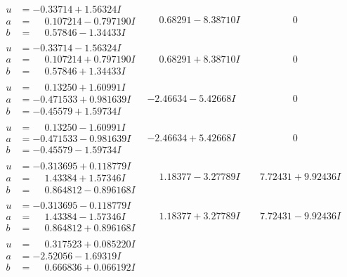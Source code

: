 \documentclass[1p]{elsarticle_modified}
\theoremstyle{definition}
\begin{document}
$$\begin{array}{c|c|c}
\begin{aligned}
u &= -0.33714 + 1.56324 I \\
a &= \phantom{-}0.107214 - 0.797190 I \\
b &= \phantom{-}0.57846 - 1.34433 I\end{aligned}
 & \phantom{-}0.68291 - 8.38710 I & \phantom{-0.000000 } 0 \\ \hline\begin{aligned}
u &= -0.33714 - 1.56324 I \\
a &= \phantom{-}0.107214 + 0.797190 I \\
b &= \phantom{-}0.57846 + 1.34433 I\end{aligned}
 & \phantom{-}0.68291 + 8.38710 I & \phantom{-0.000000 } 0 \\ \hline\begin{aligned}
u &= \phantom{-}0.13250 + 1.60991 I \\
a &= -0.471533 + 0.981639 I \\
b &= -0.45579 + 1.59734 I\end{aligned}
 & -2.46634 - 5.42668 I & \phantom{-0.000000 } 0 \\ \hline\begin{aligned}
u &= \phantom{-}0.13250 - 1.60991 I \\
a &= -0.471533 - 0.981639 I \\
b &= -0.45579 - 1.59734 I\end{aligned}
 & -2.46634 + 5.42668 I & \phantom{-0.000000 } 0 \\ \hline\begin{aligned}
u &= -0.313695 + 0.118779 I \\
a &= \phantom{-}1.43384 + 1.57346 I \\
b &= \phantom{-}0.864812 - 0.896168 I\end{aligned}
 & \phantom{-}1.18377 - 3.27789 I & \phantom{-}7.72431 + 9.92436 I \\ \hline\begin{aligned}
u &= -0.313695 - 0.118779 I \\
a &= \phantom{-}1.43384 - 1.57346 I \\
b &= \phantom{-}0.864812 + 0.896168 I\end{aligned}
 & \phantom{-}1.18377 + 3.27789 I & \phantom{-}7.72431 - 9.92436 I \\ \hline\begin{aligned}
u &= \phantom{-}0.317523 + 0.085220 I \\
a &= -2.52056 - 1.69319 I \\
b &= \phantom{-}0.666836 + 0.066192 I\end{aligned}

\end{array}$$
\end{document}
